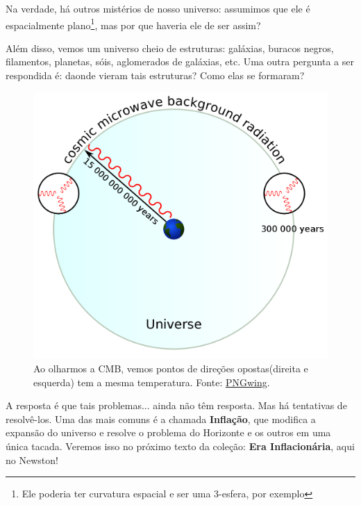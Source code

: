 \begin{multicols}{2}
Na verdade, há outros mistérios de nosso universo: assumimos que ele é espacialmente plano\footnote{Ele poderia ter curvatura espacial e ser uma 3-esfera, por exemplo}, mas por que haveria ele de ser assim?



Além disso, vemos um universo cheio de estruturas: galáxias, buracos negros, filamentos, planetas, sóis, aglomerados de galáxias, etc. Uma outra pergunta a ser respondida é: daonde vieram tais estruturas? Como elas se formaram?


\begin{figure}[H]
	\centering
	\includegraphics[width=\linewidth]{Figuras/Artigo1/horizon.png}
	\caption{Ao olharmos a CMB, vemos pontos de direções opostas(direita e esquerda) tem a mesma temperatura. Fonte: \href{https://www.pngwing.com/en/free-png-irtdi}{PNGwing}.}
	\label{fig:horizon}
\end{figure}

A resposta é que tais problemas... ainda não têm resposta. Mas há tentativas de resolvê-los. Uma das mais comuns é a chamada \textbf{Inflação}, que modifica a expansão do universo e resolve o problema do Horizonte e os outros em uma única tacada. Veremos isso no próximo texto da coleção: \textbf{Era Inflacionária}, aqui no Newston!





\end{multicols}

